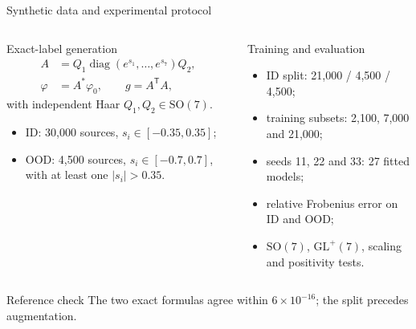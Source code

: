 \documentclass[aspectratio=169,11pt]{beamer}
\newcommand{\SO}{\mathrm{SO}}
\begin{document}
\begin{frame}{Synthetic data and experimental protocol}
    \footnotesize
    \begin{columns}[T,onlytextwidth]
        \begin{block}{Exact-label generation}
            \begin{align*}
                A&=Q_1\operatorname{diag}(e^{s_1},\ldots,e^{s_7})Q_2,\\[-0.25em]
                \varphi&=A^*\varphi_0,\qquad g=A^{\mathsf T}A,
            \end{align*}
            with independent Haar $Q_1,Q_2\in\SO(7)$.

            \begin{itemize}
                \setlength{\itemsep}{1pt}
                \item ID: 30,000 sources, $s_i\in[-0.35,0.35]$;
                \item OOD: 4,500 sources, $s_i\in[-0.7,0.7]$, with at least one $|s_i|>0.35$.
            \end{itemize}
        \end{block}

        \begin{block}{Training and evaluation}
            \begin{itemize}
                \setlength{\itemsep}{1pt}
                \item ID split: 21,000 / 4,500 / 4,500;
                \item training subsets: 2,100, 7,000 and 21,000;
                \item seeds 11, 22 and 33: 27 fitted models;
                \item relative Frobenius error on ID and OOD;
                \item $\SO(7)$, $\mathrm{GL}^+(7)$, scaling and positivity tests.
            \end{itemize}
        \end{block}
    \end{columns}

    \vspace{-0.05cm}
    \begin{alertblock}{Reference check}
        The two exact formulas agree within $6\times10^{-16}$;
        the split precedes augmentation.
    \end{alertblock}
\end{frame}
\end{document}

